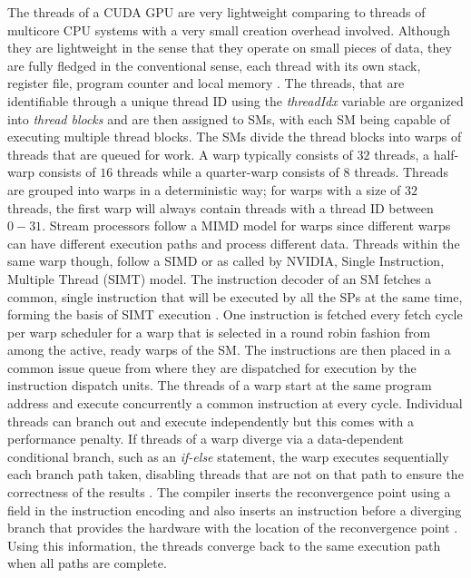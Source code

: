 \documentclass{ws-ijait}
\begin{document}
The threads of a CUDA GPU are very lightweight comparing to threads of multicore CPU systems with a very small creation overhead involved. Although they are lightweight in the sense that they operate on small pieces of data, they are fully fledged in the conventional sense, each thread with its own stack, register file, program counter and local memory \cite{Halfhill2008}. The threads, that are identifiable through a unique thread ID using the \textit{threadIdx} variable are organized into \textit{thread blocks} and are then assigned to SMs, with each SM being capable of executing multiple thread blocks. The SMs divide the thread blocks into warps of threads that are queued for work. A warp typically consists of $32$ threads, a half-warp consists of $16$ threads while a quarter-warp consists of $8$ threads. Threads are grouped into warps in a deterministic way; for warps with a size of $32$ threads, the first warp will always contain threads with a thread ID between $0-31$. Stream processors follow a MIMD model for warps since different warps can have different execution paths and process different data. Threads within the same warp though, follow a SIMD or as called by NVIDIA, Single Instruction, Multiple Thread (SIMT) model. The instruction decoder of an SM fetches a common, single instruction that will be executed by all the SPs at the same time, forming the basis of SIMT execution \cite{Lakshminarayana2010}. One instruction is fetched every fetch cycle per warp scheduler for a warp that is selected in a round robin fashion from among the active, ready warps of the SM. The instructions are then placed in a common issue queue from where they are dispatched for execution by the instruction dispatch units. The threads of a warp start at the same program address and execute concurrently a common instruction at every cycle. Individual threads can branch out and execute independently but this comes with a performance penalty. If threads of a warp diverge via a data-dependent conditional branch, such as an \textit{if-else} statement, the warp executes sequentially each branch path taken, disabling threads that are not on that path to ensure the correctness of the results \cite{CUDA_SDK}. The compiler inserts the reconvergence point using a field in the instruction encoding and also inserts an instruction before a diverging branch that provides the hardware with the location of the reconvergence point \cite{Papadopoulou2009}. Using this information, the threads converge back to the same execution path when all paths are complete. 
\end{document}

